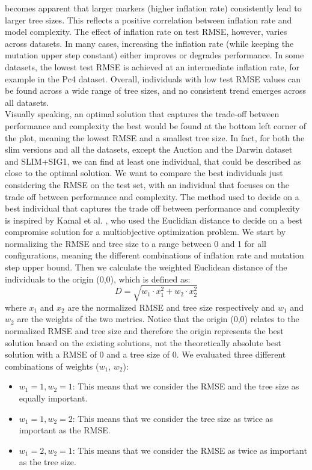 \documentclass[manuscript, review, anonymous]{acmart} %
\begin{document}
becomes apparent that larger markers (higher inflation rate) 
consistently lead to larger tree sizes. This reflects a positive correlation between inflation rate and model complexity.
The effect of inflation rate on test RMSE, however, 
varies across datasets. In many cases, increasing the inflation rate 
(while keeping the mutation upper step constant) either improves or degrades performance. 
In some datasets, the lowest test RMSE is achieved at an intermediate inflation rate, for example 
in the Pc4 dataset.
Overall, individuals with low test RMSE 
values can be found across a wide range of tree sizes, and no consistent trend emerges across all datasets.\\
Visually speaking, an optimal solution that captures the trade-off between performance and complexity the best
would be found at the bottom left corner of the
plot, meaning the lowest RMSE and a smallest tree size.
In fact,
for both the slim versions and all the datasets, except
the Auction and the Darwin dataset and SLIM+SIG1,
we can find at least one individual, that could be
described as close to the optimal solution.
We want to compare the best individuals just considering the
RMSE on the test set, with an individual that focuses
on the
trade off between performance and complexity. The method used to
decide on a best individual that captures the trade
off between performance and complexity is inspired by Kamal et al. \cite{Kamal2018}, who
used the Euclidian distance to decide on a best compromise
solution
for a multiobjective optimization problem.
We start by normalizing the RMSE and tree size to
a range between 0 and 1 for all configurations, meaning
the different
combinations of inflation rate and mutation step upper bound.
Then we calculate the weighted Euclidean distance of the individuals
to the origin (0,0), which is defined as:
\[
D = \sqrt{w_1 \cdot x_1^2 + w_2 \cdot x_2^2}\]
where $x_1$ and $x_2$ are the normalized RMSE and tree
size respectively and $w_1$ and $w_2$ are the weights of
the two metrics.
Notice that the origin (0,0) relates to the normalized RMSE and tree size
and therefore the origin represents the best solution based on the existing solutions, 
not the theoretically absolute best solution with a RMSE of 0 and a tree size of 0.
We evaluated three different combinations of weights ($w_1$, $w_2$):
\begin{itemize}
    \item $w_1 = 1, w_2 = 1$: This means that we consider the
    RMSE and the tree size as equally important.
    \item $w_1 = 1, w_2 = 2$: This means that we consider the
    tree size as twice as important as the RMSE.
    \item $w_1 = 2, w_2 = 1$: This means that we consider the
    RMSE as twice as important as the tree size.
\end{itemize}
\end{document}
